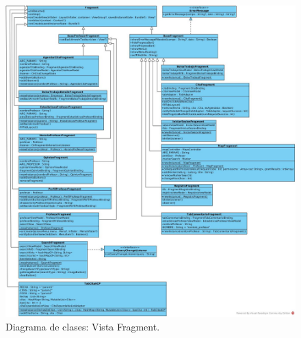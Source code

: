 \begin{figure}[!htpb]
	\hypertarget{fig:clasesVistaFrag}{\hspace{1pt}}
	\begin{center}
		\includegraphics[width=1\textwidth]{images/clases/VistaFragment}
		\caption{Diagrama de clases: Vista Fragment.}
		\label{fig:clasesVistaFrag}
	\end{center}
\end{figure}

\newpage